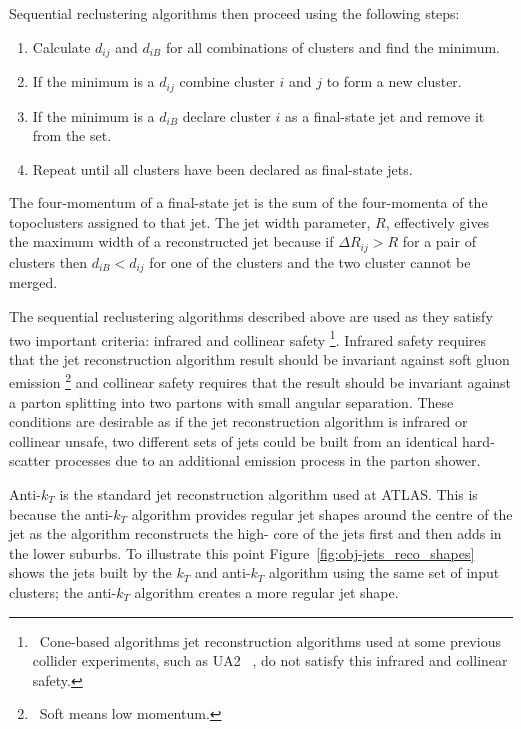 \noindent Sequential reclustering algorithms then proceed using the following steps:
\vspace{-0.5em}
\begin{enumerate}[nolistsep,leftmargin=*]
  \item Calculate $d_{ij}$ and $d_{iB}$ for all combinations of clusters and find the minimum.
  \item If the minimum is a $d_{ij}$ combine cluster $i$ and $j$ to form a new cluster. 
  \item If the minimum is a $d_{iB}$ declare cluster $i$ as a final-state jet and remove it from the set.  
  \item Repeat until all clusters have been declared as final-state jets. 
\end{enumerate} 

The four-momentum of a final-state jet is the sum of the four-momenta of the topoclusters assigned to that jet.
The jet width parameter, $R$, effectively gives the maximum width of a reconstructed jet
because if $\Delta R_{ij} > R$  for a pair of clusters then
$d_{iB} < d_{ij}$ for one of the clusters %
and the two cluster cannot be merged.

The sequential reclustering algorithms described above are used as they satisfy two important %
criteria: infrared and collinear safety \footnote{\ Cone-based algorithms jet reconstruction algorithms used at some previous collider experiments,
  such as UA2 ~\cite{obj-jets_reco_UA2}, do not satisfy this infrared and collinear safety.}.
Infrared safety requires that the jet reconstruction algorithm result should be invariant against soft gluon emission \footnote{\ Soft means low momentum.}
and collinear safety requires that the result should be invariant against a parton splitting into two partons with small angular separation.
These conditions are desirable as if the jet reconstruction algorithm is infrared or collinear unsafe,
two different sets of jets could be built from an identical hard-scatter processes
due to an additional emission process in the parton shower.

Anti-$k_T$ is the standard jet reconstruction algorithm used at ATLAS. %
This is because the anti-$k_T$ algorithm provides regular jet shapes around the centre of the jet as
the algorithm reconstructs the high-\pT{} core of the jets first and then adds in the lower \pT{} suburbs. %
To illustrate this point Figure~\ref{fig:obj-jets_reco_shapes} shows the jets built by the %
$k_T$ and anti-$k_T$ algorithm using the same set of input clusters; the anti-$k_T$ algorithm creates a more regular jet shape.

